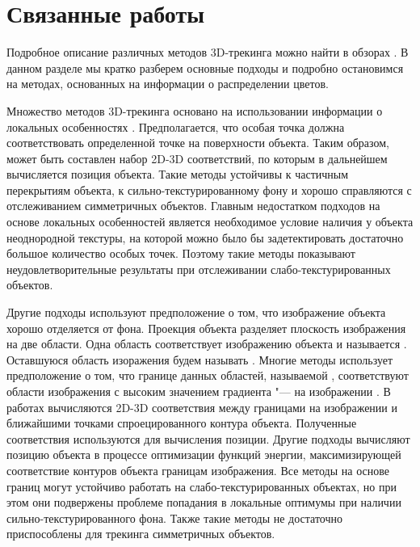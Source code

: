 \section{Связанные работы}\label{related-work}

Подробное описание различных методов 3D-трекинга можно найти в обзорах
\cite{LepetitSurvey,MarchandSurvey}.
В данном разделе мы кратко разберем основные подходы и
подробно остановимся на методах, основанных на информации о распределении
цветов.

Множество методов 3D-трекинга
\cite{Hinterstoisser2007,Vacchetti2004,Lourakis2013,Pauwels2013}
основано на использовании информации о локальных
особенностях \cite{AKAZE,SIFT,ShiAndTomasi,TomasiAndKanade,SIFT,PyrLK}.
Предполагается, что особая точка должна соответствовать определенной точке на 
поверхности объекта. Таким образом, может быть составлен набор 2D-3D 
соответствий, по которым в дальнейшем вычисляется
позиция объекта. Такие методы устойчивы к частичным перекрытиям объекта, к
сильно-текстурированному фону и хорошо справляются с отслеживанием симметричных
объектов. Главным недостатком подходов на основе локальных особенностей является
необходимое условие наличия у объекта неоднородной текстуры, на которой можно
было бы задетектировать достаточно большое количество особых точек. Поэтому
такие методы показывают неудовлетворительные результаты при отслеживании
слабо-текстурированных объектов.

Другие подходы используют предположение о том, что изображение объекта хорошо
отделяется от фона. Проекция объекта разделяет плоскость изображения на две
области. Одна область соответствует изображению объекта и называется
. Оставшуюся область изоражения будем называть
. Многие методы использует предположение о том, что границе
данных областей, называемой , соответствуют области изображения с
высоким значением градиента "---  на изображении \cite{CANNY}. В
работах
\cite{RAPID,Marchand2003,Choi2012,Marchand2006,Klein2006,SeoHinterstoisser2014,WangZhong2015,Damen2012,VacchettiEdges2004}
вычисляются 2D-3D соответствия между границами на изображении и ближайшими
точками спроецированного контура объекта. Полученные соответствия используются
для вычисления позиции. Другие подходы
\cite{WangZhong2017,Marchand2001,Bugaev_2018_ECCV} вычисляют позицию объекта в
процессе оптимизации функций энергии, максимизирующей соответствие контуров
объекта границам изображения. Все методы на основе границ могут устойчиво
работать на слабо-текстурированных объектах, но при этом они подвержены проблеме
попадания в локальные оптимумы при наличии сильно-текстурированного фона. Также
такие методы не достаточно приспособлены для трекинга симметричных объектов.

